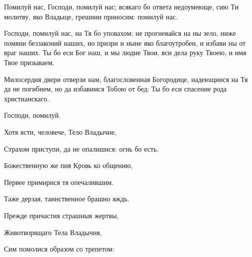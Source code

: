 \begin{mymulticols}
Помилуй нас, Господи, помилуй нас; всякаго бо ответа недоумеюще, сию Ти молитву, яко Владыце, грешнии приносим: помилуй нас.

\slava

Господи, помилуй нас, на Тя бо уповахом; не прогневайся на ны зело, ниже помяни беззаконий наших, но призри и ныне яко благоутробен, и избави ны от враг наших. Ты бо еси Бог наш, и мы людие Твои, вси дела руку Твоею, и имя Твое призываем.

\inyne

Милосердия двери отверзи нам, благословенная Богородице, надеющиися на Тя да не погибнем, но да избавимся Тобою от бед: Ты бо еси спасение рода христианскаго.

Господи, помилуй. 


Хотя ясти, человече, Тело Владычне,

Страхом приступи, да не опалишися: огнь бо есть.

Божественную же пия Кровь ко общению,

Первее примирися тя опечалившим.

Таже дерзая, таинственное брашно яждь.

Прежде причастия страшныя жертвы,

Животворящаго Тела Владычня,

Сим помолися образом со трепетом:



\end{mymulticols}
